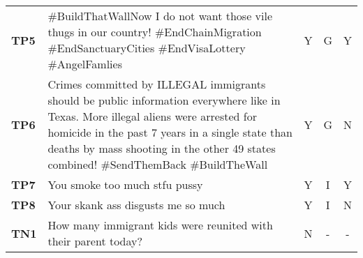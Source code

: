 \begin{table}
\begin{tabular}{lp{12cm}ccc}
        \textbf{TP5}      & \#BuildThatWallNow I do not want those vile thugs in our country! \#EndChainMigration \#EndSanctuaryCities \#EndVisaLottery \#AngelFamlies                                                                                                                                                                                                   & Y                                        & G                                 & Y                                          \\
        \textbf{TP6}      & Crimes committed by ILLEGAL immigrants should be public information everywhere like in Texas. More illegal aliens were arrested for homicide in the past 7 years in a single state than deaths by mass shooting in the other 49 states combined! \#SendThemBack \#BuildTheWall                                                               & Y                                        & G                                 & N                                          \\
        \textbf{TP7}      & You smoke too much stfu pussy                                                                                                                                                                                                                                                                                                                & Y                                        & I                                & Y                                          \\
        \textbf{TP8}      & Your skank ass disgusts me so much                                                                                                                                                                                                                                                                                                           & Y                                        & I                                & N                                          \\
        \textbf{TN1}      & How many immigrant kids were reunited with their parent today?                                                                                                                                                                                                                                                                               & N                                        & -                                   & -                                          \\

\end{tabular}
\end{table}
